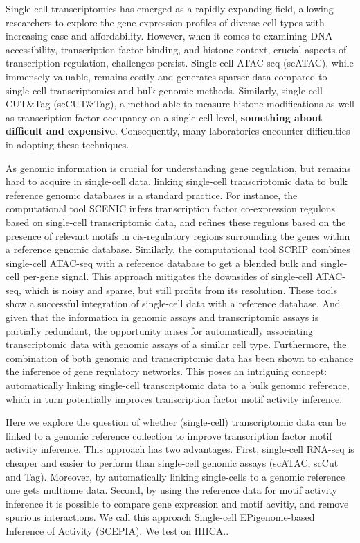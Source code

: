 Single-cell transcriptomics has emerged as a rapidly expanding field, allowing researchers to explore the gene expression profiles of diverse cell types with increasing ease and affordability. However, when it comes to examining DNA accessibility, transcription factor binding, and histone context, crucial aspects of transcription regulation, challenges persist. Single-cell ATAC-seq (scATAC)\cite{Buenrostro2015_sc}, while immensely valuable, remains costly and generates sparser data compared to single-cell transcriptomics and bulk genomic methods\cite{Li2021}. Similarly, single-cell CUT\&Tag (scCUT\&Tag)\cite{Bartosovic2021}, a method able to measure histone modifications as well as transcription factor occupancy on a single-cell level, \textbf{something about difficult and expensive}. Consequently, many laboratories encounter difficulties in adopting these techniques.

As genomic information is crucial for understanding gene regulation, but remains hard to acquire in single-cell data, linking single-cell transcriptomic data to bulk reference genomic databases is a standard practice. For instance, the computational tool SCENIC infers transcription factor co-expression regulons based on single-cell transcriptomic data, and refines these regulons based on the presence of relevant motifs in cis-regulatory regions surrounding the genes within a reference genomic database\cite{Aibar_2017,VandeSande2020}. Similarly, the computational tool SCRIP combines single-cell ATAC-seq with a reference database to get a blended bulk and single-cell per-gene signal. This approach mitigates the downsides of single-cell ATAC-seq, which is noisy and sparse, but still profits from its resolution\cite{Dong2022}. These tools show a successful integration of single-cell data with a reference database. And given that the information in genomic assays and transcriptomic assays is partially redundant\cite{Wang2016,GonzlezRamrez2021}, the opportunity arises for automatically associating transcriptomic data with genomic assays of a similar cell type. Furthermore, the combination of both genomic and transcriptomic data has been shown to enhance the inference of gene regulatory networks\cite{Xu_2020,Kamal_2021}. This poses an intriguing concept: automatically linking single-cell transcriptomic data to a bulk genomic reference, which in turn potentially improves transcription factor motif activity inference.

Here we explore the question of whether (single-cell) transcriptomic data can be linked to a genomic reference collection to improve transcription factor motif activity inference. This approach has two advantages. First, single-cell RNA-seq is cheaper and easier to perform than single-cell genomic assays (scATAC, scCut and Tag). Moreover, by automatically linking single-cells to a genomic reference one gets multiome data. Second, by using the reference data for motif activity inference it is possible to compare gene expression and motif acvitiy, and remove spurious interactions. We call this approach Single-cell EPigenome-based Inference of Activity (SCEPIA). We test on HHCA..

